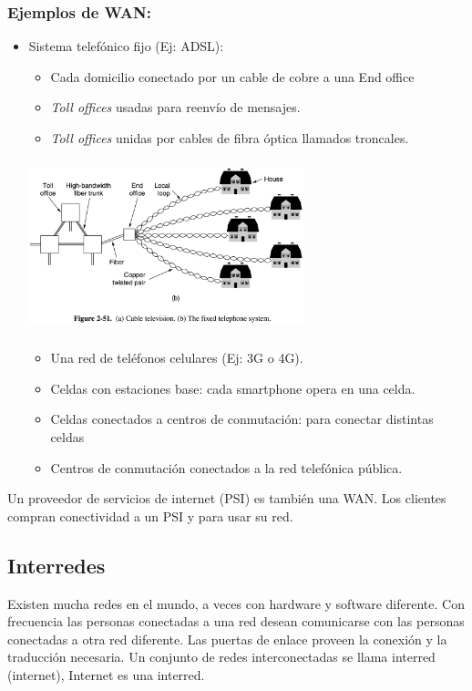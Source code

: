 \documentclass[10pt,a4paper]{report}
\begin{document}
\subsubsection{Ejemplos de WAN:}
\begin{itemize}
\item Sistema telefónico fijo (Ej: ADSL):
\begin{itemize}
	\item Cada domicilio conectado por un cable de cobre a una End office
 	\item \textit{Toll offices} usadas para reenvío de mensajes.
 	\item \textit{Toll offices} unidas por cables de fibra óptica llamados troncales.
\end{itemize}	

\begin{center} 
	\includegraphics[width=8cm, height=5cm]{./imagenes/telefonico.png} 
\end{center}

\begin{itemize}
	\item Una red de teléfonos celulares (Ej: 3G o 4G).
	\item Celdas con estaciones base: cada smartphone opera en una celda.
	\item Celdas conectados a centros de conmutación: para conectar distintas celdas
 	\item Centros de conmutación conectados a la red telefónica pública.
\end{itemize}

\end{itemize}

\par Un proveedor de servicios de internet (PSI) es también una WAN. Los clientes compran conectividad a un PSI y para usar su red.

\subsection{Interredes}
\par Existen mucha redes en el mundo, a veces con hardware y software diferente. 
Con frecuencia las personas conectadas a una red desean comunicarse con las 
personas conectadas a otra red diferente. Las puertas de enlace proveen la conexión y 
la traducción necesaria. Un conjunto de redes interconectadas se llama interred 
(internet), Internet es una interred.
\end{document}
